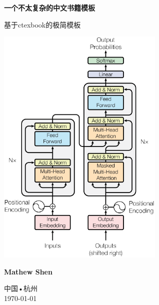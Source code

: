 \documentclass{ctexbook}
\begin{document}
\frontmatter
\begin{titlepage}
    \begin{center}
        \vspace*{1cm}
 
        \textbf{一个不太复杂的中文书籍模板}
 
        \vspace{0.5cm}
         基于ctexbook的极简模板
             
        \vspace{0.5cm}
 
        \includegraphics[width=0.6\textwidth]{./figures/transformer.pdf}

        \vfill

        \textbf{Mathew Shen}
        \vspace{1cm}
      
        中国•杭州\\
        \today

    \end{center}
 \end{titlepage}


\tableofcontents
\setcounter{tocdepth}{2}




\mainmatter






\backmatter




\printbibliography[title={参考文献}, heading=bibintoc]

\printindex

\end{document}
